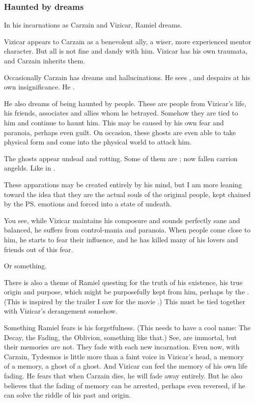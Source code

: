 \subsubsection{Haunted by dreams}
In his incarnations as Carzain and Vizicar, Ramiel dreams. 

Vizicar appears to Carzain as a benevolent ally, a wiser, more experienced mentor character. But all is not fine and dandy with him. Vizicar has his own traumata, and Carzain inherits them. 

Occasionally Carzain has dreams and hallucinations. 
He sees , and despairs at his own insignificance. 
He .

He also dreams of being haunted by people. 
These are people from Vizicar's life, his friends, associates and allies whom he betrayed. Somehow they are tied to him and continue to haunt him. This may be caused by his own fear and paranoia, perhaps even guilt.
On occasion, these ghosts are even able to take physical form and come into the physical world to attack him. 

The ghosts appear undead and rotting. 
Some of them are \resphain; now fallen carrion angelds. 
Like in . 

These apparations may be created entirely by his mind, but I am more leaning toward the idea that they are the actual souls of the original people, kept chained by the \ps{\Malach}{} emotions and forced into a state of undeath. 

You see, while Vizicar maintains his composure and sounds perfectly sane and balanced, he suffers from control-mania and paranoia. When people come close to him, he starts to fear their influence, and he has killed many of his lovers and friends out of this fear. 

Or something. 

There is also a theme of Ramiel questing for the truth of his existence, his true origin and purpose, which might be purposefully kept from him, perhaps by the \banes. 
(This is inspired by the trailer I saw for the movie \cite{Movie:BourneUltimatum}.) 
This must be tied together with Vizicar's derangement somehow. 

Something Ramiel fears is his forgetfulness. (This needs to have a cool name: The Decay, the Fading, the Oblivion, something like that.) 
See, \Malachim{} are immortal, but their memories are not. 
They fade with each new incarnation. Even now, with Carzain, Tydesmos is little more than a faint voice in Vizicar's head, a memory of a memory, a ghost of a ghost. And Vizicar can feel the memory of his own life fading. He fears that when Carzain dies, he will fade away entirely. But he also believes that the fading of memory can be arrested, perhaps even reversed, if he can solve the riddle of his past and origin. 





